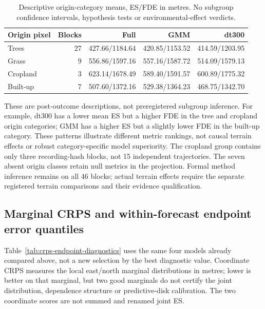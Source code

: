 \documentclass[11pt]{article}
\begin{document}
\begin{table}[htbp]
\centering\small
\caption{Descriptive origin-category means, ES/FDE in metres. No subgroup
confidence intervals, hypothesis tests or environmental-effect verdicts.}
\label{tab:origin-cover-methods}
\begin{tabular}{lrrrr}
\toprule
Origin pixel & Blocks & Full & GMM & dt300\\
\midrule
Trees & 27 & 427.66/1184.64 & 420.85/1153.52 & 414.59/1203.95\\
Grass & 9 & 556.86/1597.16 & 557.16/1587.72 & 514.09/1579.13\\
Cropland & 3 & 623.14/1678.49 & 589.40/1591.57 & 600.89/1775.32\\
Built-up & 7 & 507.60/1372.16 & 529.38/1364.23 & 468.75/1342.70\\
\bottomrule
\end{tabular}
\end{table}

These are post-outcome descriptions, not preregistered subgroup inference.
For example, dt300 has a lower mean ES but a higher FDE in the tree and
cropland origin categories; GMM has a higher ES but a slightly lower FDE in
the built-up category. These patterns illustrate different metric rankings,
not causal terrain effects or robust category-specific model superiority.
The cropland group contains only three recording-hash blocks, not 15
independent trajectories. The seven absent origin classes retain null
metrics in the projection. Formal method inference remains on all 46
blocks; actual terrain effects require the separate registered terrain
comparisons and their evidence qualification.




\subsection{Marginal CRPS and within-forecast endpoint error quantiles}
\label{sec:secondary-score-diagnostics}
Table~\ref{tab:crps-endpoint-diagnostics} uses the same four models already
compared above, not a new selection by the best diagnostic value. Coordinate
CRPS measures the local east/north marginal distributions in metres; lower is
better on that marginal, but two good marginals do not certify the joint
distribution, dependence structure or predictive-disk calibration. The two
coordinate scores are not summed and renamed joint ES.
\end{document}
